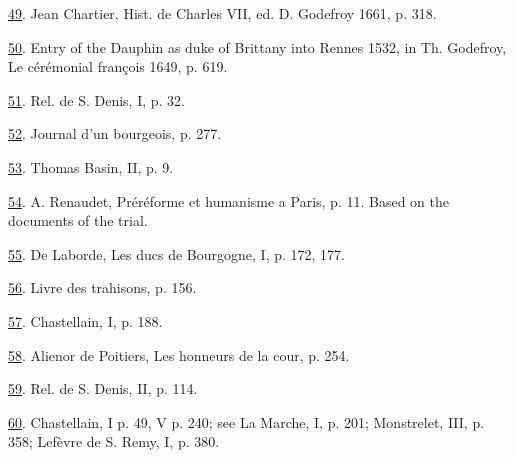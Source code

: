 \protect\hypertarget{23_NOTES.xhtmlux5cux23id_1991}{\protect\hyperlink{09_Chapter_Two__THE_CRAVING_FOR_A_M.xhtmlux5cux23id_1990}{49}}.
Jean Chartier, Hist. de Charles VII, ed. D. Godefroy 1661, p. 318.

\protect\hypertarget{23_NOTES.xhtmlux5cux23id_1989}{\protect\hyperlink{09_Chapter_Two__THE_CRAVING_FOR_A_M.xhtmlux5cux23id_1988}{50}}.
Entry of the Dauphin as duke of Brittany into Rennes 1532, in Th.
Godefroy, Le cérémonial françois 1649, p. 619.

\protect\hypertarget{23_NOTES.xhtmlux5cux23id_1987}{\protect\hyperlink{09_Chapter_Two__THE_CRAVING_FOR_A_M.xhtmlux5cux23id_1986}{51}}.
Rel. de S. Denis, I, p. 32.

\protect\hypertarget{23_NOTES.xhtmlux5cux23id_1985}{\protect\hyperlink{09_Chapter_Two__THE_CRAVING_FOR_A_M.xhtmlux5cux23id_1984}{52}}.
Journal d'un bourgeois, p. 277.

\protect\hypertarget{23_NOTES.xhtmlux5cux23id_1983}{\protect\hyperlink{09_Chapter_Two__THE_CRAVING_FOR_A_M.xhtmlux5cux23id_1982}{53}}.
Thomas Basin, II, p. 9.

\protect\hypertarget{23_NOTES.xhtmlux5cux23id_1981}{\protect\hyperlink{09_Chapter_Two__THE_CRAVING_FOR_A_M.xhtmlux5cux23id_1980}{54}}.
A. Renaudet, Préréforme et humanisme a Paris, p. 11. Based on the
documents of the trial.

\protect\hypertarget{23_NOTES.xhtmlux5cux23id_1979}{\protect\hyperlink{09_Chapter_Two__THE_CRAVING_FOR_A_M.xhtmlux5cux23id_1978}{55}}.
De Laborde, Les ducs de Bourgogne, I, p. 172, 177.

\protect\hypertarget{23_NOTES.xhtmlux5cux23id_1977}{\protect\hyperlink{09_Chapter_Two__THE_CRAVING_FOR_A_M.xhtmlux5cux23id_1976}{56}}.
Livre des trahisons, p. 156.

\protect\hypertarget{23_NOTES.xhtmlux5cux23id_1975}{\protect\hyperlink{09_Chapter_Two__THE_CRAVING_FOR_A_M.xhtmlux5cux23id_1974}{57}}.
Chastellain, I, p. 188.

\protect\hypertarget{23_NOTES.xhtmlux5cux23id_1973}{\protect\hyperlink{09_Chapter_Two__THE_CRAVING_FOR_A_M.xhtmlux5cux23id_1972}{58}}.
Alienor de Poitiers, Les honneurs de la cour, p. 254.

\protect\hypertarget{23_NOTES.xhtmlux5cux23id_1971}{\protect\hyperlink{09_Chapter_Two__THE_CRAVING_FOR_A_M.xhtmlux5cux23id_1970}{59}}.
Rel. de S. Denis, II, p. 114.

\protect\hypertarget{23_NOTES.xhtmlux5cux23id_1969}{\protect\hyperlink{09_Chapter_Two__THE_CRAVING_FOR_A_M.xhtmlux5cux23id_1968}{60}}.
Chastellain, I p. 49, V p. 240; see La Marche, I, p. 201; Monstrelet,
III, p. 358; Lefèvre de S. Remy, I, p. 380.

